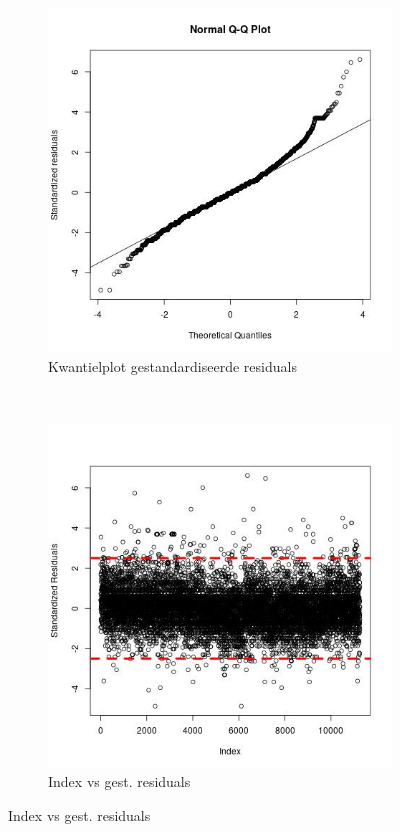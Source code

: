 \documentclass[a4paper,kulak]{kulakarticle} %
\begin{document}
\begin{figure}[H]
	\centering
	\begin{subfigure}[b]{0.3\textwidth}
		\includegraphics[width=\textwidth]{pcqq.jpeg}
		\caption{Kwantielplot gestandardiseerde residuals}
		\label{fig:pcqq}
	\end{subfigure}
	~ %
	\begin{subfigure}[b]{0.3\textwidth}
		\includegraphics[width=\textwidth]{pcisr.jpeg}
		\caption{Index vs gest. residuals}
		\label{fig:pcisr}
	\end{subfigure}
\end{figure}
\end{document}
